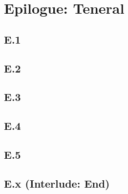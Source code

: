 \part*{Epilogue: Teneral}
 \chapter*{E.1}
 \chapter*{E.2}
 \chapter*{E.3}
 \chapter*{E.4}
 \chapter*{E.5}
 \chapter*{E.x (Interlude: End)}







